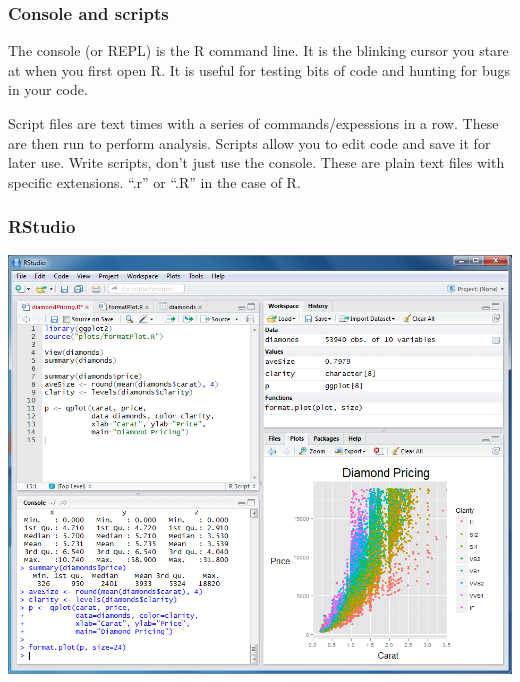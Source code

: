 \documentclass{beamer}\usepackage{graphicx, color}
\begin{document}
\begin{frame}
  \frametitle{Console and scripts}
  The console (or REPL) is the R command line. It is the blinking cursor you stare at when you first open R. It is useful for testing bits of code and hunting for bugs in your code.

  Script files are text times with a series of commands/expessions in a row. These are then run to perform analysis. Scripts allow you to edit code and save it for later use. Write scripts, don't just use the console. These are plain text files with specific extensions. ``.r'' or ``.R'' in the case of R.

\end{frame}

\begin{frame}
  \frametitle{RStudio}
  \includegraphics[height = 0.8\textheight, keepaspectratio = true]{figure/rstudio}

\end{frame}
\end{document}
